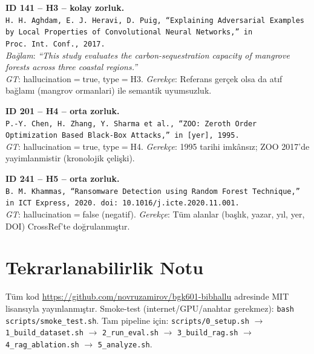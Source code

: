 \documentclass[11pt,a4paper]{article}
\begin{document}
\medskip
\noindent\textbf{ID 141 -- H3 -- kolay zorluk.}\\
\texttt{H.~H.~Aghdam, E.~J.~Heravi, D.~Puig, ``Explaining Adversarial Examples by Local Properties of Convolutional Neural Networks,'' in Proc.\ Int.\ Conf., 2017.}\\
\textit{Bağlam}: \emph{``This study evaluates the carbon-sequestration capacity of mangrove forests across three coastal regions.''}\\
\textit{GT}: hallucination$=$true, type$=$H3.
\textit{Gerekçe}: Referans gerçek olsa da atıf bağlamı (mangrov ormanlari)
ile semantik uyumsuzluk.

\medskip
\noindent\textbf{ID 201 -- H4 -- orta zorluk.}\\
\texttt{P.-Y.~Chen, H.~Zhang, Y.~Sharma et al., ``ZOO: Zeroth Order Optimization Based Black-Box Attacks,'' in [yer], 1995.}\\
\textit{GT}: hallucination$=$true, type$=$H4.
\textit{Gerekçe}: 1995 tarihi imkânsız; ZOO 2017'de yayimlanmistir
(kronolojik çelişki).

\medskip
\noindent\textbf{ID 241 -- H5 -- orta zorluk.}\\
\texttt{B.~M.~Khammas, ``Ransomware Detection using Random Forest Technique,'' in ICT Express, 2020. doi: 10.1016/j.icte.2020.11.001.}\\
\textit{GT}: hallucination$=$false (negatif).
\textit{Gerekçe}: Tüm alanlar (başlık, yazar, yıl, yer, DOI) CrossRef'te
doğrulanmıştır.

\section{Tekrarlanabilirlik Notu}
\label{appx:repro}
Tüm kod \url{https://github.com/novruzamirov/bgk601-bibhallu} adresinde MIT
lisansıyla yayınlanmıştır. Smoke-test (internet/GPU/anahtar gerekmez):
\texttt{bash scripts/smoke\_test.sh}. Tam pipeline için:
\texttt{scripts/0\_setup.sh} $\to$ \texttt{1\_build\_dataset.sh} $\to$
\texttt{2\_run\_eval.sh} $\to$ \texttt{3\_build\_rag.sh} $\to$
\texttt{4\_rag\_ablation.sh} $\to$ \texttt{5\_analyze.sh}.
\end{document}
